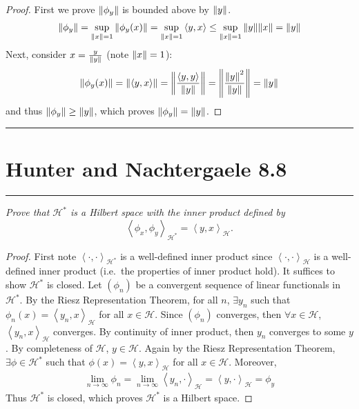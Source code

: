\documentclass{article} %
\theoremstyle{plain}
\newcommand{\VEC}[2]{\left\langle #1, #2 \right\rangle}
\newcommand{\problem}[1]{
\vspace{.375cm}
\begin{minipage}{\textwidth}
    \begin{center}
        \noindent\rule{5cm}{1pt}
    \end{center}
    \section{\bf #1}
    \begin{center}
        \noindent\rule{5cm}{1pt}
    \end{center}
    \vspace{0.25cm}
\end{minipage}
}
\numberwithin{equation}{section} %
\numberwithin{figure}{section} %
\numberwithin{table}{section} %
\begin{document}
\begin{proof}
    First we prove $\norm{\phi_y}$ is bounded above by $\norm{y}$.
    \begin{align*}
        \norm{\phi_y} = \sup_{\norm{x} = 1}\norm{\phi_y(x)} = \sup_{\norm{x} = 1}\VEC{y}{x} \leq \sup_{\norm{x} = 1}\norm{y}\norm{x} = \norm{y}
    \end{align*}
    Next, consider $x = \frac{y}{\norm{y}}$ (note $\norm{x} = 1$):
    \begin{align*}
        \norm{\phi_y(x)} = \norm{\VEC{y}{x}} = \norm{\frac{\VEC{y}{y}}{\norm{y}}} = \norm{\frac{\norm{y}^2}{\norm{y}}} = \norm{y}
    \end{align*}
    and thus $\norm{\phi_y} \geq \norm{y}$, which proves $\norm{\phi_y} = \norm{y}$.
\end{proof}










\problem{Hunter and Nachtergaele 8.8}
\emph{Prove that $\mathcal{H}^*$ is a Hilbert space with the inner product defined by $$ \VEC{\phi_x}{\phi_y}_{\mathcal{H}^*} = \VEC{y}{x}_\mathcal{H}.$$}

\begin{proof}
    First note $\VEC{\cdot}{\cdot}_{\mathcal{H}^*}$ is a well-defined inner product since $\VEC{\cdot}{\cdot}_\mathcal{H}$ is a well-defined inner product (i.e.~the properties of inner product hold).  It suffices to show $\mathcal{H}^*$ is closed.  Let $(\phi_n)$ be a convergent sequence of linear functionals in $\mathcal{H}^*$.  By the Riesz Representation Theorem, for all $n$, $\exists y_n$ such that $\phi_n(x) = \VEC{y_n}{x}_\mathcal{H}$ for all $x \in \mathcal{H}$.  Since $(\phi_n)$ converges, then $\forall x \in \mathcal{H}$, $\VEC{y_n}{x}_\mathcal{H}$ converges.  By continuity of inner product, then $y_n$ converges to some $y$.  By completeness of $\mathcal{H}$, $y \in \mathcal{H}$.  Again by the Riesz Representation Theorem, $\exists \phi \in \mathcal{H}^*$ such that $\phi(x) = \VEC{y}{x}_\mathcal{H}$ for all $x \in \mathcal{H}$.  Moreover,
    \begin{align*}
        \lim_{n\rightarrow\infty}\phi_n = \lim_{n\rightarrow \infty}\VEC{y_n}{\cdot}_\mathcal{H} = \VEC{y}{\cdot}_\mathcal{H} = \phi_y
    \end{align*}
    Thus $\mathcal{H}^*$ is closed, which proves $\mathcal{H}^*$ is a Hilbert space.
\end{proof}
\end{document}
